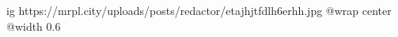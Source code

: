  
 
 
 
 

\ifcmt
  ig https://mrpl.city/uploads/posts/redactor/etajhjtfdlh6erhh.jpg
  @wrap center
  @width 0.6
\fi
